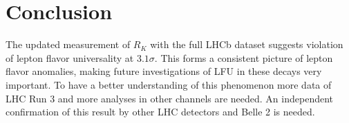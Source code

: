 \section{Conclusion}
The updated measurement of $R_K$ with the full LHCb dataset 
suggests violation of lepton flavor universality at $3.1\sigma$.
This forms a consistent picture of lepton flavor anomalies,
making future investigations of LFU in these decays very important.
To have a better understanding of this phenomenon more data of 
LHC Run 3 and more analyses in other channels are needed.
An independent confirmation of this result by other LHC detectors and 
Belle 2 is needed.
